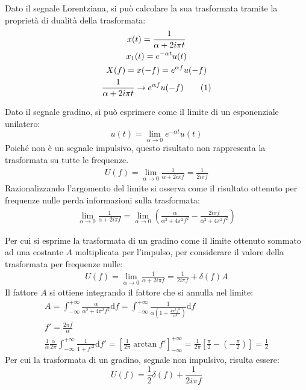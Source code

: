 \documentclass{article}
\newcommand{\df}{\mathrm{d}}
\newcommand{\tageq}{\tag{\stepcounter{equation}\theequation}}
\numberwithin{equation}{subsection}
\begin{document}
Dato il segnale Lorentziana, si può calcolare la sua trasformata tramite la proprietà di dualità della trasformata: 
\begin{gather*}
    x(t)=\displaystyle\frac{1}{\alpha+2i\pi t}\\
    x_1(t)=e^{-\alpha t}u(t)\\
    X(f)=x(-f)=e^{\alpha f}u(-f)\\
    \displaystyle\frac{1}{\alpha+2i\pi t}\to e^{\alpha f}u(-f)\tageq
\end{gather*}


Dato il segnale gradino, si può esprimere come il limite di un esponenziale unilatero:
\begin{equation*}
    u(t)=\lim_{\alpha\to0}e^{-\alpha t}{u(t)}
\end{equation*}
Poiché non è un segnale impulsivo, questo risultato non rappresenta la trasformata su tutte le frequenze. 
\begin{gather*}
    U(f)=\displaystyle\lim_{\alpha\to0}\frac{1}{\alpha+2i\pi f}=\frac{1}{2i\pi f}
\end{gather*}
Razionalizzando l'argomento del limite si osserva come il risultato ottenuto per frequenze nulle perda informazioni sulla trasformata:
\begin{gather*}
    \displaystyle\lim_{\alpha\to0}\frac{1}{\alpha+2i\pi f}=\lim_{\alpha\to0}\left(\frac{\alpha}{\alpha^2+4\pi^2f^2}-\frac{2i\pi f}{\alpha^2+4\pi^2f^2}\right)
\end{gather*}


Per cui si esprime la trasformata di un gradino come il limite ottenuto sommato ad una costante $A$ moltiplicata per l'impulso, per considerare il valore della trasformata 
per frequenze nulle: 
\begin{gather*}
    U(f)=\displaystyle\lim_{\alpha\to0}\frac{1}{\alpha+2i\pi f}=\frac{1}{2i\pi f}+\delta(f)A
\end{gather*}
Il fattore $A$ si ottiene integrando il fattore che si annulla nel limite:
\begin{gather*}
    A=\displaystyle\int_{-\infty}^{+\infty}\frac{\alpha}{\alpha^2+4\pi^2f^2}\df f=\int_{-\infty}^{+\infty}\frac{1}{\alpha\left(1+\frac{4\pi^2f^2}{\alpha^2}\right)}\df f\\
    f'=\displaystyle\frac{2\pi f}{\alpha}\\
    \displaystyle\frac{1}{\alpha}\frac{\alpha}{2\pi}\int_{-\infty}^{+\infty}\frac{1}{1+f'^2}\df f'=\left[\frac{1}{2\pi}\arctan f'\right]^{+\infty}_{-\infty}=\frac{1}{2\pi}\left[\frac{\pi}{2}-\left(-\frac{\pi}{2}\right)\right]=\frac{1}{2}
\end{gather*}
Per cui la trasformata di un gradino, segnale non impulsivo, risulta essere:
\begin{equation}
    U(f)=\displaystyle\frac{1}{2}\delta(f)+\frac{1}{2i\pi f}
\end{equation}
\end{document}
